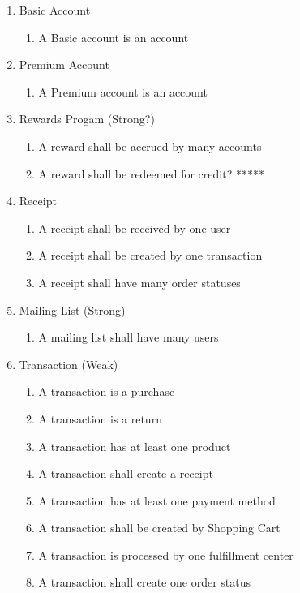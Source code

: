 \documentclass{article}
\begin{document}
\begin{enumerate}
\item Basic Account
\begin{enumerate}
	\item A Basic account is an account
\end{enumerate}
	
\item Premium Account
\begin{enumerate}
	\item A Premium account is an account
\end{enumerate}

\item Rewards Progam (Strong?)
\begin{enumerate}
	\item A reward shall be accrued by many accounts
	\item A reward shall be redeemed for credit? *****
\end{enumerate}
	
\item Receipt
\begin{enumerate}
	\item A receipt shall be received by one user
	\item A receipt shall be created by one transaction
	\item A receipt shall have many order statuses
\end{enumerate}
	
\item Mailing List (Strong)
\begin{enumerate}
	\item A mailing list shall have many users
\end{enumerate}

\item Transaction (Weak)
\begin{enumerate}
	\item A transaction is a purchase
	\item A transaction is a return
	\item A transaction has at least one product
	\item A transaction shall create a receipt
	\item A transaction has at least one payment method
	\item A transaction shall be created by Shopping Cart
	\item A transaction is processed by one fulfillment center
	\item A transaction shall create one order status
\end{enumerate}
	

\end{enumerate}
\end{document}
